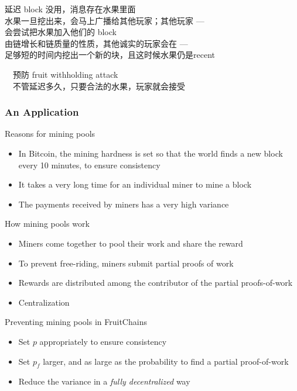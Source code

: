 \documentclass{beamer}
\begin{document}
\begin{spacing}{1.2}
{{	延迟 block 没用，消息存在水果里面\\
	
	水果一旦挖出来，会马上广播给其他玩家；其他玩家 --- \\
	会尝试把水果加入他们的 block\\

	由链增长和链质量的性质，其他诚实的玩家会在 ---\\
	足够短的时间内挖出一个新的块，且这时候水果仍是recent\\
	}
	
	{\color{red}
	\ \ 预防 fruit withholding attack\\
	
	\ \ 不管延迟多久，只要合法的水果，玩家就会接受\\
	
	}
}

\begin{frame}
	\frametitle{An Application}
	\vspace{-5pt}
	\begin{block}{Reasons for mining pools}
		\begin{itemize}
			\item In Bitcoin, the mining hardness is set so that the world finds a new block every 10 minutes, to ensure consistency
			\item It takes a very long time for an individual miner to mine a block
			\item The payments received by miners has a very high variance
		\end{itemize}
	\end{block}
	\vspace{-3pt}
	\begin{block}{How mining pools work}
		\begin{itemize}
			\item Miners come together to pool their work and share the reward
			\item To prevent free-riding, miners submit partial proofs of work
			\item Rewards are distributed among the contributor of the partial proofs-of-work
			\item Centralization
		\end{itemize}
	\end{block}
	\vspace{-3pt}
	\begin{block}{Preventing mining pools in FruitChains}
		\begin{itemize}
			\item Set $p$ appropriately to ensure consistency
			\item Set $p_f$ larger, and as large as the probability to find a partial proof-of-work
			\item Reduce the variance in a \textit{fully decentralized} way
		\end{itemize}
	\end{block}
\end{frame}


\end{spacing}
\end{document}
